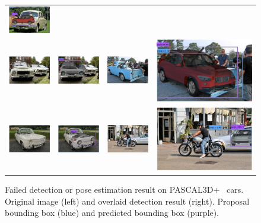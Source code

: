 \documentclass[10pt,twocolumn,letterpaper]{article}
\begin{document}
\begin{figure}[h]
\begin{tabular}{|cc|cc|}
  \includegraphics[width=0.22\linewidth]{supp/pas_car12b.png} \\
  \includegraphics[width=0.22\linewidth]{supp/pas_car14a.png} &
  \includegraphics[width=0.22\linewidth]{supp/pas_car14b.png} & 
  \includegraphics[width=0.22\linewidth]{supp/pas_car15a.png} &
  \includegraphics[width=0.22\linewidth]{supp/pas_car15.png} \\ 
  \includegraphics[width=0.22\linewidth]{supp/pas_car20a.png} &
  \includegraphics[width=0.22\linewidth]{supp/pas_car20b.png} &
  \includegraphics[width=0.22\linewidth]{supp/pas_car23a.png} &
  \includegraphics[width=0.22\linewidth]{supp/pas_car23b.png} \\
  \hline
  \end{tabular}
\caption{Failed detection or pose estimation result on
  PASCAL3D+~\cite{Xiang14} cars. Original image (left) and
  overlaid detection result (right). Proposal bounding box (blue) and
  predicted bounding box (purple).} 
  \label{fig:pascal3d_car_bad}
\end{figure}
\end{document}
